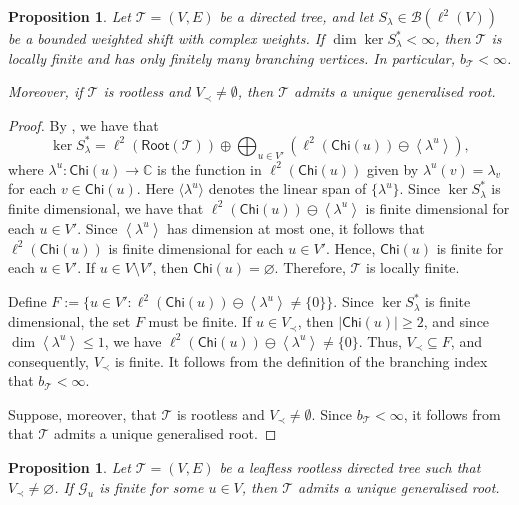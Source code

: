 \documentclass[11pt, reqno, a4paper]{amsart}
\newtheorem{proposition}[theorem]{Proposition}
\theoremstyle{definition}
\newcommand{\calB}{{\mathcal{B}}}
\newcommand{\scrG}{{\mathscr G}}
\newcommand{\scrT}{{\mathscr T}}
\newcommand{\ip}[1]{\left\langle #1 \right\rangle}
\newcommand{\abs}[1]{\left\lvert #1 \right\rvert}
\renewcommand{\le}{\leqslant}
\renewcommand{\ge}{\geqslant}
\newcommand{\C}{\mathbb C}
\newcommand{\Chi}{\mathsf{Chi}}
\numberwithin{equation}{section}
\begin{document}
\begin{proposition}
\label{prop:finite-codimension}
    Let $\scrT=( V, E)$ be a directed tree, and let $S_\lambda\in\calB(\ell^2( V))$ be a bounded weighted shift with complex weights. If $\dim\ker S_\lambda^*<\infty$, then $\scrT$ is locally finite and has only finitely many branching vertices. In particular, $b_{\scrT}<\infty$.

    Moreover, if $\scrT$ is rootless and $ V_{\prec} \ne \emptyset$, then $\scrT$ admits a unique generalised root.
\end{proposition}

\begin{proof}
    By \cite[Proposition 3.5.1]{MR2919910}, we have that
    \begin{equation*}
        \ker S_{\lambda}^{*}=\ell^2(\mathsf{Root}(\scrT))\oplus\bigoplus_{u\in V'}\left(\ell^2(\Chi(u))\ominus\ip{\lambda^{u}}\right),
    \end{equation*}
    where $\lambda^{u}:\Chi(u)\to\C$ is the function in $\ell^2(\Chi(u))$ given by $\lambda^{u}(v)=\lambda_v$ for each $v\in\Chi(u)$. Here $\langle\lambda^u\rangle$ denotes the linear span of $\{\lambda^u\}$. Since $\ker S_{\lambda}^{*}$ is finite dimensional, we have that $\ell^2(\Chi(u))\ominus\ip{\lambda^{u}}$ is finite dimensional for each $u\in V'$. Since $\ip{\lambda^{u}}$ has dimension at most one, it follows that $\ell^2(\Chi(u))$ is finite dimensional for each $u\in V'$. Hence, $\Chi(u)$ is finite for each $u\in V'$. If $u\in V\setminus V'$, then $\Chi(u)=\varnothing$. Therefore, $\scrT$ is locally finite.

    Define $F:=\{u\in V':\ell^2(\Chi(u))\ominus\ip{\lambda^{u}}\ne\{0\}\}$. Since $\ker S_{\lambda}^{*}$ is finite dimensional, the set $F$ must be finite. If $u\in V_{\prec}$, then $\abs{\Chi(u)}\ge2$, and since $\dim\ip{\lambda^{u}}\le1$, we have $\ell^2(\Chi(u))\ominus\ip{\lambda^{u}}\ne\{0\}$. Thus, $ V_{\prec}\subseteq F$, and consequently, $ V_{\prec}$ is finite. It follows from the definition of the branching index that $b_{\scrT}<\infty$.

    Suppose, moreover, that $\scrT$ is rootless and $ V_{\prec} \ne \emptyset$. Since $b_{\scrT}<\infty$, it follows from  that $\scrT$ admits a unique generalised root.
\end{proof}


    \begin{proposition}
        \label{prop:some-finite-generation-implies-generalised-root}
        Let $\scrT=( V, E)$ be a leafless rootless directed tree such that $ V_{\prec}\ne\varnothing$. If $\scrG_u$ is finite for some $u\in V$, then $\scrT$ admits a unique generalised root.
    \end{proposition}
    
\end{document}

